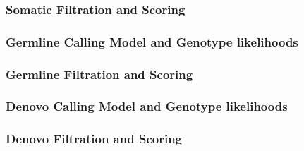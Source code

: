 \documentclass{article}
\begin{document}
\subsubsection{Somatic Filtration and Scoring}

\subsubsection{Germline Calling Model and Genotype likelihoods}

\subsubsection{Germline Filtration and Scoring}

\subsubsection{Denovo Calling Model and Genotype likelihoods}

\subsubsection{Denovo Filtration and Scoring}




\end{document}
